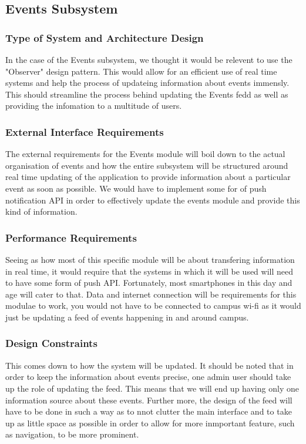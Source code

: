 \documentclass{article}
\begin{document}
		\subsection{Events Subsystem}
		\subsubsection{Type of System and Architecture Design}
				In the case of the Events subsystem, we thought it would be relevent to use the "Observer" design pattern. This would allow for an efficient use of real time systems and help the process of updateing information about events immensly. This should streamline the process behind updating the Events fedd as well as providing the infomation to a multitude of users. 
				
			\subsubsection{External Interface Requirements}
					The external requirements for the Events module will boil down to the actual organisation of events and how the entire subsystem will be structured around real time updating of the application to provide information about a particular event as soon as possible. We would have to implement some for of push notification API in order to effectively update the events module and provide this kind of information.

			\subsubsection{Performance Requirements}
					Seeing as how most of this specific module will be about transfering information in real time, it would require that the systems in which it will be used will need to have some form of push API. Fortunately, most smartphones in this day and age will cater to that. Data and internet connection will be requirements for this modulae to work, you would not have to be connected to campus wi-fi as it would just be updating a feed of events happening in and around campus.
		
			\subsubsection{Design Constraints}
					This comes down to how the system will be updated. It should be noted that in order to keep the information about events precise, one admin user should take up the role of updating the feed. This means that we will end up having only one information source about these events. Further more, the design of the feed will have to be done in such a way as to nnot clutter the main interface and to take up as little space as possible in order to allow for more inmportant feature, such as navigation, to be more prominent.
\end{document}
